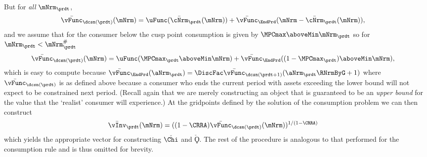  But for \textit{all} $\mNrm_{\prdt}$,
  \begin{equation*}\begin{gathered}\begin{aligned}
        \bar{\vFunc}_{\dcsn(\prdt)}(\mNrm)  & = \uFunc(\bar{\cNrm}_{\prdt}(\mNrm))+ \bar{\vFunc}_{\EndPrd}(\mNrm-\bar{\cNrm}_{\prdt}(\mNrm)),
      \end{aligned}\end{gathered}\end{equation*}
  and we assume that for the consumer below the cusp point consumption is given by $\MPCmax \aboveMin \mNrm_{\prdt}$ so for $\mNrm_{\prdt}< \mtCusp$
  \begin{equation*}\begin{gathered}\begin{aligned}
        \bar{\vFunc}_{\dcsn(\prdt)}(\mNrm)  & = \uFunc( \MPCmax_{\prdt} \aboveMin \mNrm)+ \bar{\vFunc}_{\EndPrd}((1-\MPCmax_{\prdt})\aboveMin \mNrm),
      \end{aligned}\end{gathered}\end{equation*}
  which is easy to compute because $\bar{\vFunc}_{\EndPrd}(\aNrm_{\prdt}) = \DiscFac \bar{\vFunc}_{\dcsn(\prdt+1)}(\aNrm_{\prdt}\RNrmByG+1)$ where $\bar{\vFunc}_{\dcsn(\prdt)}$ is as defined above because a consumer who ends the current period with assets exceeding the lower bound will not expect to be constrained next period.  (Recall again that we are merely constructing an object that is guaranteed to be an \textit{upper bound} for the value that the `realist' consumer will experience.)  At the gridpoints defined by the solution of the consumption problem we can then construct
  \begin{equation*}\begin{gathered}\begin{aligned}
        \bar{\vInv}_{\prdt}(\mNrm)  & = ((1-\CRRA)\bar{\vFunc}_{\dcsn(\prdt)}(\mNrm))^{1/(1-\CRRA)}
      \end{aligned}\end{gathered}\end{equation*}
 which yields the appropriate vector for constructing $\check{\Chi}$ and $\check{\Koppa}$.  The rest of the procedure is analogous to that performed for the consumption rule and is thus omitted for brevity.



\hypertarget{extension-a-stochastic-interest-factor}{}
